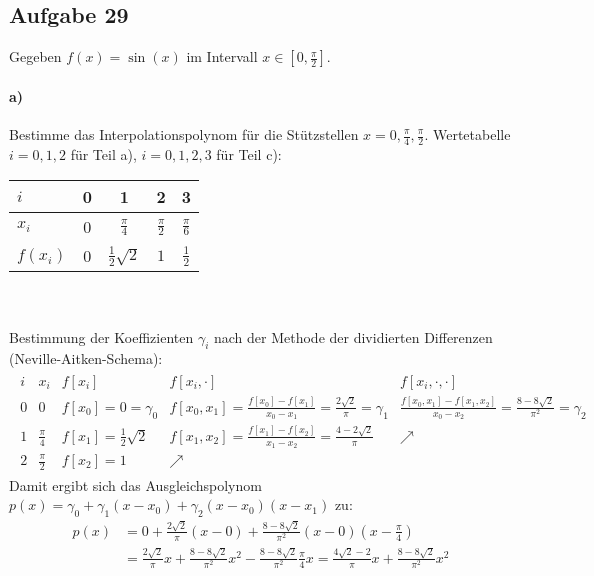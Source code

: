 \subsection*{Aufgabe 29}
Gegeben $f(x) = \sin(x)$  im Intervall $x \in [0, \frac{\pi}{2}]$.

\paragraph*{a)}
Bestimme das Interpolationspolynom für die Stützstellen $x = 0,  \frac{\pi}{4},  \frac{\pi}{2}$.
Wertetabelle $i = 0, 1, 2$ für Teil a), $i = 0, 1, 2, 3$ für Teil c): \newline
\begin{tabular}{l|cccc}
  $i$ & 0 & 1 & 2 & 3 \\
  \hline
  $x_i$ & 0 & $\frac{\pi}{4}$ &  $\frac{\pi}{2}$ &  $\frac{\pi}{6}$\\
  \hline
  $f(x_i)$ & 0 & $\frac{1}{2}\sqrt{2}$ &  $1$  &  $\frac{1}{2}$
\end{tabular} \\\\
Bestimmung der Koeffizienten $\gamma_i$ nach der Methode der dividierten
Differenzen (Neville-Aitken-Schema):
\begin{align}
\label{eq-schema}
\begin{array}{l|l|l|l|l}
  i & x_i & f[x_i] & f[x_i , \cdot] & f[x_i , \cdot, \cdot]\\
 \hline
  0 & 0 & f[x_0] = 0 = \gamma_0 &
    f[x_0, x_1] = \frac{f[x_0] - f[x_1]}{x_0 - x_1} = \frac{2 \sqrt{2}}{\pi} = \gamma_1&
    \frac{f[x_0, x_1] - f[x_1, x_2]}{x_0 - x_2} = \frac{8 - 8 \sqrt{2}}{\pi^2} = \gamma_2\\
  1 & \frac{\pi}{4} & f[x_1] = \frac{1}{2}\sqrt{2} &
    f[x_1, x_2] = \frac{f[x_1] - f[x_2]}{x_1 - x_2} = \frac{4 - 2 \sqrt{2}}{\pi} & \nearrow\\
  2 & \frac{\pi}{2} & f[x_2] = 1 & \nearrow
\end{array}
\end{align}
Damit ergibt sich das Ausgleichspolynom $p(x) = \gamma_0 + \gamma_1(x-x_0) + \gamma_2(x-x_0)(x-x_1)$ zu:
\begin{align*}
p(x) & = 0 +  \frac{2 \sqrt{2}}{\pi} \left(x - 0\right) +
\left.\frac{8 - 8 \sqrt{2}}{\pi^2} \left(x- 0\right)\left(x-\frac{\pi}{4}\right)\right. \\
& = \frac{2 \sqrt{2}}{\pi} x + \frac{8 - 8 \sqrt{2}}{\pi^2} x^2 - \frac{8 - 8 \sqrt{2}}{\pi^2} \frac{\pi}{4} x
= \frac{4 \sqrt{2} - 2}{\pi} x + \frac{8 - 8 \sqrt{2}}{\pi^2} x^2
\end{align*}

